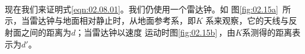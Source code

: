 \begin{figurex}[!b]
  \centering
   \\ \vspace{-0.3em}
   \\ \vspace{-0.3em}
   \\ \vspace{-0.3em}
  \caption{}
  \label{fig:02.15}
\end{figurex}
现在我们来证明式\eqref{eqn:02.08.01}。我们仍使用一个雷达钟。如
图\ref{fig:02.15a}~所示，当雷达钟与地面相对静止时，从地面参考系，即$K$
系来观察，它的天线与反射面之间的距离为$ d$；当雷达钟以速度
运动时\lhbrak 图\ref{fig:02.15b}\,\rhbrak ，由$K$系测得的距离表示为$d'$。

